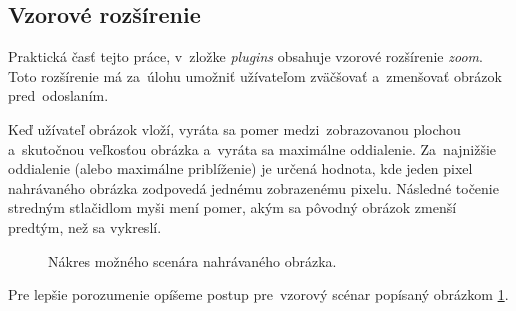 \subsection{Vzorové rozšírenie}
\label{sec:vzorove-rozsirenie}

Praktická časť tejto práce, v~zložke \emph{plugins} obsahuje vzorové rozšírenie \emph{zoom}. Toto rozšírenie má za~úlohu umožniť užívateľom zväčšovať a~zmenšovať obrázok pred~odoslaním.

Keď užívateľ obrázok vloží, vyráta sa pomer medzi~zobrazovanou plochou a~skutočnou veľkosťou obrázka a~vyráta sa maximálne oddialenie. Za~najnižšie oddialenie (alebo maximálne priblíženie) je určená hodnota, kde jeden pixel nahrávaného obrázka zodpovedá jednému zobrazenému pixelu. Následné točenie stredným stlačidlom myši mení pomer, akým sa pôvodný obrázok zmenší predtým, než sa vykreslí.

\begin{figure}[!hb]
	\centering
	\caption{Nákres možného scenára nahrávaného obrázka.}
	\label{fig:zoom-scenar}
\end{figure}

Pre lepšie porozumenie opíšeme postup pre~vzorový scénar popísaný obrázkom \ref{fig:zoom-scenar}. 

